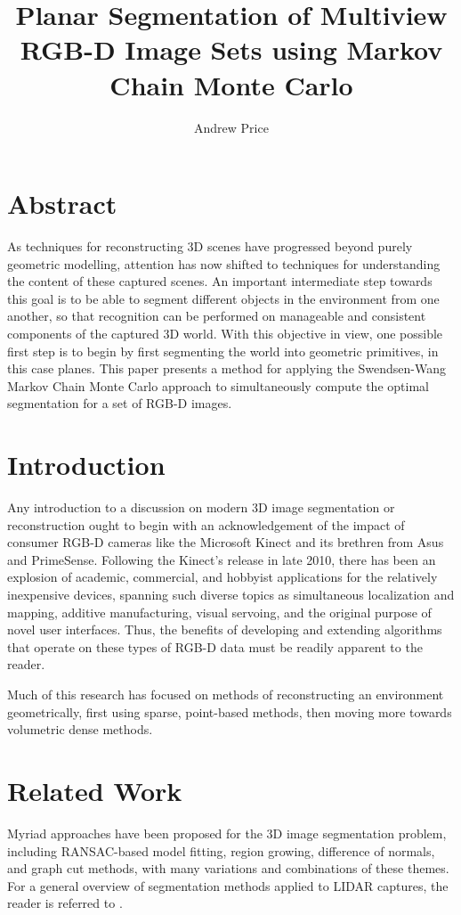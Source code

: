 \documentclass[10pt,letterpaper]{article}
\author{Andrew Price}
\title{Planar Segmentation of Multiview RGB-D Image Sets using Markov Chain Monte Carlo }
\begin{document}
\maketitle

\section{Abstract}
	As techniques for reconstructing 3D scenes have progressed beyond purely geometric modelling, attention has now shifted to techniques for understanding the content of these captured scenes. An important intermediate step towards this goal is to be able to segment different objects in the environment from one another, so that recognition can be performed on manageable and consistent components of the captured 3D world. With this objective in view, one possible first step is to begin by first segmenting the world into geometric primitives, in this case planes. This paper presents a method for applying the Swendsen-Wang Markov Chain Monte Carlo approach to simultaneously compute the optimal segmentation for a set of RGB-D images.
		
\section{Introduction}
	Any introduction to a discussion on modern 3D image segmentation or reconstruction ought to begin with an acknowledgement of the impact of consumer RGB-D cameras like the Microsoft Kinect and its brethren from Asus and PrimeSense. Following the Kinect's release in late 2010, there has been an explosion of academic, commercial, and hobbyist applications for the relatively inexpensive devices, spanning such diverse topics as simultaneous localization and mapping, additive manufacturing, visual servoing, and the original purpose of novel user interfaces. Thus, the benefits of developing and extending algorithms that operate on these types of RGB-D data must be readily apparent to the reader.
	
	Much of this research has focused on methods of reconstructing an environment geometrically, first using sparse, point-based methods, then moving more towards volumetric dense methods.
	
\section{Related Work}
	Myriad approaches have been proposed for the 3D image segmentation problem, including RANSAC-based model fitting, region growing, difference of normals, and graph cut methods, with many variations and combinations of these themes. For a general overview of segmentation methods applied to LIDAR captures, the reader is referred to \cite{douillard2011segmentation}. 
	
\end{document}
